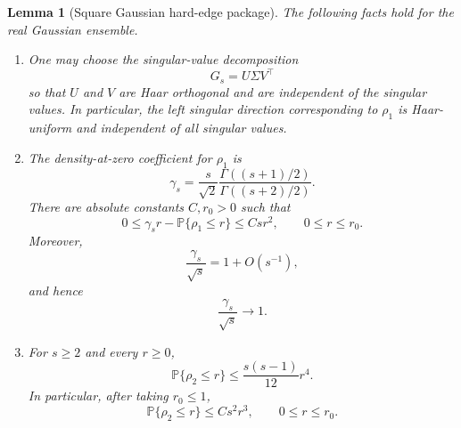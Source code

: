 \documentclass[11pt]{article}
\newtheorem{lemma}{Lemma}
\newcommand{\Pbb}{\mathbb P}
\newcommand{\1}{\mathbf 1}
\begin{document}
\begin{lemma}[Square Gaussian hard-edge package]
\label{lem:square-hard-edge-package}
The following facts hold for the real Gaussian ensemble.

\begin{enumerate}[label=(\alph*)]
    \item One may choose the singular-value decomposition
    \[
            G_s=U\Sigma V^\top
    \]
    so that \(U\) and \(V\) are Haar orthogonal and are independent of the singular
    values.  In particular, the left singular direction corresponding to \(\rho_1\) is
    Haar-uniform and independent of all singular values.

    \item The density-at-zero coefficient for \(\rho_1\) is
    \begin{equation}
            \gamma_s
            =
            \frac{s}{\sqrt2}
            \frac{\Gamma((s+1)/2)}{\Gamma((s+2)/2)}.
            \label{eq:gamma-s-explicit}
    \end{equation}
    There are absolute constants \(C,r_0>0\) such that
    \begin{equation}
            0
            \le
            \gamma_s r-\Pbb\{\rho_1\le r\}
            \le
            Csr^2,
            \qquad
            0\le r\le r_0.
            \label{eq:uniform-square-hard-edge-expansion}
    \end{equation}
    Moreover,
    \begin{equation}
            \frac{\gamma_s}{\sqrt{s}}
            =
            1+O(s^{-1}),
            \label{eq:gamma-s-asymptotic}
    \end{equation}
    and hence
    \[
            \frac{\gamma_s}{\sqrt{s}}\longrightarrow1.
    \]

    \item For \(s\ge2\) and every \(r\ge0\),
    \begin{equation}
            \Pbb\{\rho_2\le r\}
            \le
            \frac{s(s-1)}{12}r^4.
            \label{eq:second-singular-value-r4}
    \end{equation}
    In particular, after taking \(r_0\le1\),
    \begin{equation}
            \Pbb\{\rho_2\le r\}
            \le
            Cs^2r^3,
            \qquad
            0\le r\le r_0.
            \label{eq:second-singular-value-r3}
    \end{equation}
\end{enumerate}
\end{lemma}
\end{document}
